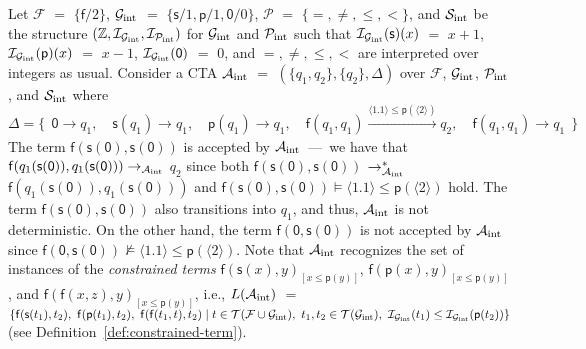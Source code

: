 \documentclass[copyright,creativecommons]{eptcs}
\newcommand{\cA}{\mathcal{A}}
\newcommand{\cF}{\mathcal{F}}
\newcommand{\cG}{\mathcal{G}}
\newcommand{\cI}{\mathcal{I}}
\newcommand{\cP}{\mathcal{P}}
\newcommand{\cS}{\mathcal{S}}
\newcommand{\posvar}[1]{{\langle}#1{\rangle}}
\newcommand{\Terms}{{\mathcal{T}}}
\newcommand{\TwC}[2]{{#1}_{[#2]}}
\begin{document}
\begin{example}\label{ex:CTA}
Let $\cF$ $=$ $\{ \mathsf{f}/2 \}$, $\cG_{\rm int}$ $=$
 $\{ \mathsf{s}/1, \mathsf{p}/1, \mathsf{0}/0 \}$, $\cP$ $=$ $\{ =, \ne, 
 \leq, < \}$, and $\cS_{\rm int}$ be the structure
 $(\mathbb{Z},\cI_{\cG_{\rm int}},\cI_{\cP_{\rm int}})$ for $\cG_{\rm
 int}$ and $\cP_{\rm int}$ such that $\cI_{\cG_{\rm
 int}}(\mathsf{s})(x)$ $=$ $x+1$, $\cI_{\cG_{\rm int}}(\mathsf{p})(x)$
 $=$ $x-1$, $\cI_{\cG_{\rm int}}(\mathsf{0})$ $=$ $0$, and
 $=,\ne,\leq,<$ are interpreted over integers as usual.
 Consider a CTA $\cA_{\rm int}$ $=$ $(\{ q_1, q_2 \},\{ q_2 \},\Delta)$
 over $\cF$, $\cG_{\rm int}$, $\cP_{\rm int}$, and $\cS_{\rm int}$ where 
 \[
 \Delta = 
 \{~~
 \mathsf{0} \to q_1,
 \quad
 \mathsf{s}(q_1) \to q_1, 
 \quad
 \mathsf{p}(q_1) \to q_1, 
 \quad
 \mathsf{f}(q_1,q_1) \xrightarrow[]{\posvar{1.1} \leq \mathsf{p}(\posvar{2})} q_2,
 \quad
 \mathsf{f}(q_1,q_1) \to q_1
 ~~\}
\]
 The term
 $\mathsf{f}(\mathsf{s}(\mathsf{0}),\mathsf{s}(\mathsf{0}))$ is accepted
 by $\cA_{\rm int}$~---~we have that
 $\mathsf{f}(q_1(\mathsf{s}(\mathsf{0})),q_1(\mathsf{s}(\mathsf{0})))
 \to_{\cA_{\rm int}}$ $q_2$ since both 
 $\mathsf{f}(\mathsf{s}(\mathsf{0}),\mathsf{s}(\mathsf{0}))$
 $\to^*_{\cA_{\rm int}}$
 $\mathsf{f}(q_1(\mathsf{s}(\mathsf{0})),q_1(\mathsf{s}(\mathsf{0})))$
 and $\mathsf{f}(\mathsf{s}(\mathsf{0}),\mathsf{s}(\mathsf{0})) \models 
 \posvar{1.1} \leq \mathsf{p}(\posvar{2})$ hold.
 The term $\mathsf{f}(\mathsf{s}(\mathsf{0}),\mathsf{s}(\mathsf{0}))$
 also transitions into $q_1$, and thus, $\cA_{\rm int}$ is not
 deterministic. 
 On the other hand, the term
 $\mathsf{f}(\mathsf{0},\mathsf{s}(\mathsf{0}))$ is not accepted by
 $\cA_{\rm int}$ since
 $\mathsf{f}(\mathsf{0},\mathsf{s}(\mathsf{0})) \not\models \posvar{1.1}
 \leq \mathsf{p}(\posvar{2})$. 
 Note that $\cA_{\rm int}$ recognizes the set of instances of the
 \emph{constrained terms} $\TwC{\mathsf{f}(\mathsf{s}(x),y)}{x \leq \mathsf{p}(y)}$,
 $\TwC{\mathsf{f}(\mathsf{p}(x),y)}{x \leq \mathsf{p}(y)}$, and 
 $\TwC{\mathsf{f}(\mathsf{f}(x,z),y)}{x \leq \mathsf{p}(y)}$,  
i.e.,  
 $L(\cA_{\rm int})$ $=$ 
 $\{ \mathsf{f}(\mathsf{s}(t_1),t_2),
 ~
 \mathsf{f}(\mathsf{p}(t_1),t_2),
 ~
 \mathsf{f}(\mathsf{f}(t_1,t),t_2)
 \mid t \in \Terms(\cF\cup\cG_{\rm int}),
 ~t_1,t_2 \in \Terms(\cG_{\rm int}),~\cI_{\cG_{\rm int}}(t_1) \leq
 \cI_{\cG_{\rm int}}(\mathsf{p}(t_2)) \}$ (see
 Definition~\ref{def:constrained-term}).


\end{example}
\end{document}
